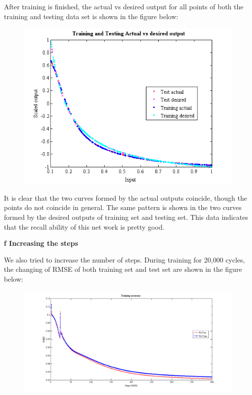 \documentclass[epsfig]{article}
\def\bpar{\vskip26pt}
\def\npar{\vskip13pt}
\begin{document}
After training is finished, the actual vs desired output for all points of both the training and testing data set is shown in the figure below:

\begin{figure}[!htb] 
	\centering\includegraphics[width=4.5in]{fig4.png} 
\end{figure} 

It is clear that the two curves formed by the actual outputs coincide, though the points do not coincide in general. The same pattern is shown in the two curves formed by the desired outputs of training set and testing set. This data indicates that the recall ability of this net work is pretty good.

{\bf 
	\npar
	f Increasing the steps
	\bpar
}

We also tried to increase the number of steps. During training for 20,000 cycles, the changing of RMSE of both training set and test set are shown in the figure below:

\begin{figure}[!htb] 
	\centering\includegraphics[width=6in]{fig5.png} 
\end{figure} 
\end{document}
